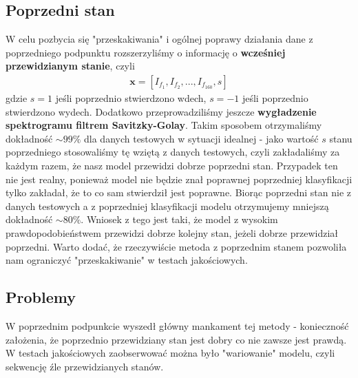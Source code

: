 \documentclass[polish]{article}
\begin{document}
\subsection{Poprzedni stan}
W celu pozbycia się "przeskakiwania" i ogólnej poprawy działania dane z poprzedniego podpunktu rozszerzyliśmy o informację o \textbf{wcześniej przewidzianym stanie}, czyli 
\begin{gather*}
	\boldsymbol{x} = [I_{f_1}, I_{f_2}, ..., I_{f_{160}},  s]
\end{gather*}
 gdzie $s = 1$ jeśli poprzednio stwierdzono wdech, $s=-1$ jeśli poprzednio stwierdzono wydech.
Dodatkowo przeprowadziliśmy jeszcze \textbf{wygładzenie spektrogramu filtrem Savitzky-Golay}.
Takim sposobem otrzymaliśmy dokładność $\sim 99\%$ dla danych testowych w sytuacji idealnej - jako wartość $s$ stanu poprzedniego stosowaliśmy tę wziętą z
danych testowych, czyli zakładaliśmy za każdym razem, że nasz model przewidzi dobrze poprzedni stan.
Przypadek ten nie jest realny, ponieważ model nie będzie znał poprawnej poprzedniej klasyfikacji tylko 
zakładał, że to co sam stwierdził jest poprawne.  Biorąc poprzedni stan nie z danych testowych a z poprzedniej
klasyfikacji modelu otrzymujemy mniejszą dokładność $\sim 80\%$. Wniosek z tego jest taki, że model
z wysokim prawdopodobieństwem przewidzi dobrze kolejny stan, jeżeli dobrze przewidział poprzedni. 
Warto dodać, że rzeczywiście metoda z poprzednim stanem pozwoliła nam ograniczyć "przeskakiwanie" 
w testach jakościowych.
\subsection{Problemy}
W poprzednim podpunkcie wyszedł główny mankament tej metody - konieczność założenia, że poprzednio
przewidziany stan jest dobry co nie zawsze jest prawdą. W testach jakościowych zaobserwować można było
"wariowanie" modelu, czyli sekwencję źle przewidzianych stanów.
\end{document}

